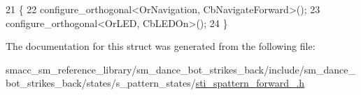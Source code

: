 \begin{DoxyCode}
21   \{
22     configure\_orthogonal<OrNavigation, CbNavigateForward>();
23     configure\_orthogonal<OrLED, CbLEDOn>();
24   \}
\end{DoxyCode}


The documentation for this struct was generated from the following file\+:\begin{DoxyCompactItemize}
\item 
smacc\+\_\+sm\+\_\+reference\+\_\+library/sm\+\_\+dance\+\_\+bot\+\_\+strikes\+\_\+back/include/sm\+\_\+dance\+\_\+bot\+\_\+strikes\+\_\+back/states/s\+\_\+pattern\+\_\+states/\hyperlink{strikes__back_2include_2sm__dance__bot__strikes__back_2states_2s__pattern__states_2sti__spattern__forward__2_8h}{sti\+\_\+spattern\+\_\+forward\+\_.\+h}\end{DoxyCompactItemize}
